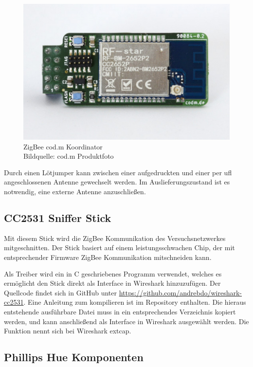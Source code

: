 \begin{figure}[H]
  \centering
  \includegraphics[width=1\textwidth]{media/codm.png}
  \caption{ZigBee cod.m Koordinator \\ Bildquelle: cod.m Produktfoto}
\end{figure}

Durch einen Lötjumper kann zwischen einer aufgedruckten und einer per \grqq ufl\grqq{} angeschlossenen Antenne gewechselt werden. Im Auslieferungszustand
ist es notwendig, eine externe Antenne anzuschließen.

\subsection{CC2531 Sniffer Stick}

Mit diesem Stick wird die ZigBee Kommunikation des Versuchsnetzwerkes mitgeschnitten.
Der Stick basiert auf einem leistungsschwachen Chip, der mit entsprechender Firmware ZigBee Kommunikation mitschneiden kann. 

Als Treiber wird ein in C geschriebenes Programm verwendet, welches es ermöglicht den Stick direkt als Interface in Wireshark hinzuzufügen. Der Quellcode findet sich in 
GitHub unter \url{https://github.com/andrebdo/wireshark-cc2531}. Eine Anleitung zum kompilieren ist im Repository enthalten. Die hieraus entstehende ausführbare Datei muss in ein
entsprechendes Verzeichnis kopiert werden, und kann anschließend als Interface in Wireshark ausgewählt werden. Die Funktion nennt sich bei Wireshark \grqq extcap\grqq{}.

\subsection{Phillips Hue Komponenten}

